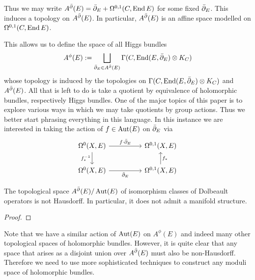 \documentclass[12pt]{ociamthesis}  %
\begin{document}
Thus we may write $A^{\bar{\partial}} (E) = \bar{\partial}_E + \Omega^{0,1}(C,\operatorname{End} E)$
for some fixed $\bar{\partial}_E$. This induces a topology on $A^{\bar{\partial}} (E)$.
In particular, $A^{\bar{\partial}} (E)$ is an affine space modelled on
$\Omega^{0,1}(C,\operatorname{End} E)$.

This allows us to define the space of all Higgs bundles
\begin{align*}
  A^\phi(E) := \bigsqcup_{\bar{\partial}_E \in A^{\bar{\partial}} (E)} \Gamma(C,\operatorname{End}(E,\bar{\partial}_E)\otimes K_C)
\end{align*}
whose topology is induced by the topologies on
$\Gamma(C,\operatorname{End}(E,\bar{\partial}_E)\otimes K_C)$ and $A^{\bar{\partial}} (E)$.
All that is left to do is take a quotient by equivalence of holomorphic
bundles, respectively Higgs bundles. One of the major topics of this
paper is to explore various ways in which we may take quotients by
group actions. Thus we better start phrasing everything in this language.
In this instance we are interested in taking the action of $f\in\operatorname{Aut}(E)$
on $\bar{\partial}_E$ via
\begin{equation}
  \begin{tikzcd}
    {\Omega^0(X,E)} && {\Omega^{0,1}(X,E)} \\
    {\Omega^0(X,E)} && {\Omega^{0,1}(X,E)}
    \arrow["{f\cdot\bar\partial_E}", from=1-1, to=1-3]
    \arrow["{f_*^{-1}}"', from=1-1, to=2-1]
    \arrow["{\bar\partial_E}"', from=2-1, to=2-3]
    \arrow["{f_*}"', from=2-3, to=1-3]
  \end{tikzcd}
\end{equation}
\begin{lemma}
  The topological space $A^{\bar{\partial}} (E)/\operatorname{Aut}(E)$ of isomorphism classes of
  Dolbeault operators is not Hausdorff. In particular, it does not
  admit a manifold structure.
  \begin{proof}
    \missingproof
  \end{proof}
\end{lemma}

Note that we have a similar action of $\operatorname{Aut}(E)$ on $A^\phi(E)$ and
indeed many other topological spaces of holomorphic bundles. However,
it is quite clear that any space that arises as a disjoint union
over $A^{\bar{\partial}} (E)$ must also be non-Hausdorff. Therefore we need
to use more sophisticated techniques to construct any moduli
space of holomorphic bundles.
\end{document}
